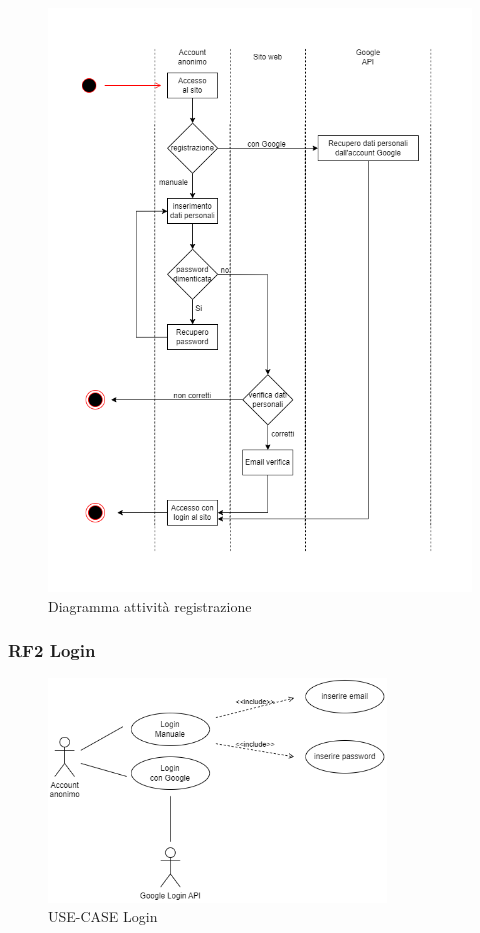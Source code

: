 \documentclass[a4paper,12pt]{article}
\begin{document}
\begin{figure}[H]
   \centering
    \includegraphics[width=1\textwidth]{img-D2/diagramma_registrazione.png}
    \caption{Diagramma attività registrazione}
\end{figure}


\subsubsection*{RF2 Login}
\begin{figure}[H]
   \centering
   \includegraphics[width=0.8\textwidth]{img-D2/login_anonimo.png}
    \caption{USE-CASE Login}
\end{figure}
\end{document}
